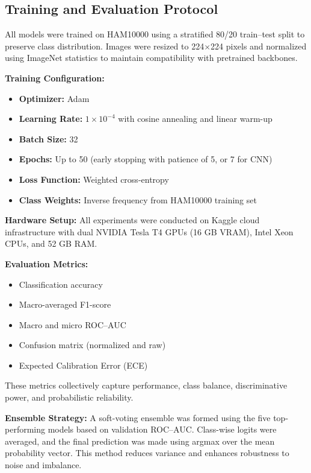 \documentclass[pdflatex,sn-mathphys-num]{sn-jnl}%
\theoremstyle{thmstyleone}%
\theoremstyle{thmstyletwo}%
\theoremstyle{thmstylethree}%
\begin{document}
\subsection{Training and Evaluation Protocol}\label{subsubsec2}

All models were trained on HAM10000 using a stratified 80/20 train–test split to preserve class distribution.  
Images were resized to 224$\times$224 pixels and normalized using ImageNet statistics to maintain compatibility with pretrained backbones.

\vspace{0.5em}
\noindent\textbf{Training Configuration:}
\begin{itemize}
    \item \textbf{Optimizer:} Adam
    \item \textbf{Learning Rate:} $1 \times 10^{-4}$ with cosine annealing and linear warm-up
    \item \textbf{Batch Size:} 32
    \item \textbf{Epochs:} Up to 50 (early stopping with patience of 5, or 7 for CNN)
    \item \textbf{Loss Function:} Weighted cross-entropy
    \item \textbf{Class Weights:} Inverse frequency from HAM10000 training set
\end{itemize}

\vspace{0.5em}
\noindent\textbf{Hardware Setup:}  
All experiments were conducted on Kaggle cloud infrastructure with dual NVIDIA Tesla T4 GPUs (16 GB VRAM), Intel Xeon CPUs, and 52 GB RAM.

\vspace{0.5em}
\noindent\textbf{Evaluation Metrics:}
\begin{itemize}
    \item Classification accuracy
    \item Macro-averaged F1-score
    \item Macro and micro ROC–AUC
    \item Confusion matrix (normalized and raw)
    \item Expected Calibration Error (ECE)
\end{itemize}

These metrics collectively capture performance, class balance, discriminative power, and probabilistic reliability.

\vspace{0.5em}
\noindent\textbf{Ensemble Strategy:}  
A soft-voting ensemble was formed using the five top-performing models based on validation ROC–AUC.  
Class-wise logits were averaged, and the final prediction was made using argmax over the mean probability vector.  
This method reduces variance and enhances robustness to noise and imbalance.
\end{document}

